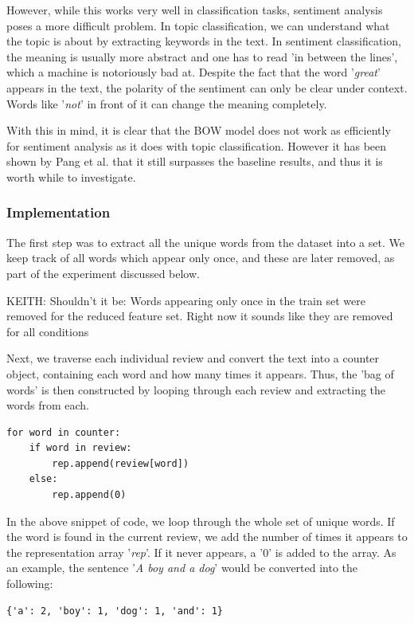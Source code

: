 \documentclass{article}
\begin{document}
However, while this works very well in classification tasks, sentiment analysis poses a more difficult problem. In topic classification, we can understand what the topic is about by extracting keywords in the text. In sentiment classification, the meaning is usually more abstract and one has to read 'in between the lines', which a machine is notoriously bad at. Despite the fact that the word '\textit{great}' appears in the text, the polarity of the sentiment can only be clear under context. Words like '\textit{not}' in front of it can change the meaning completely.

With this in mind, it is clear that the BOW model does not work as efficiently for sentiment analysis as it does with topic classification. However it has been shown by Pang et al. \cite{pangetal} that it still surpasses the baseline results, and thus it is worth while to investigate.

\subsubsection{Implementation}

The first step was to extract all the unique words from the dataset into a set. We keep track of all words which appear only once, and these are later removed, as part of the experiment discussed below. 

KEITH: Shouldn't it be: Words appearing only once in the train set were removed for the reduced feature set. Right now it sounds like they are removed for all conditions


Next, we traverse each individual review and convert the text into a counter object, containing each word and how many times it appears. Thus, the 'bag of words' is then constructed by looping through each review and extracting the words from each.

\begin{lstlisting}
for word in counter:
	if word in review:
		rep.append(review[word])
	else:
		rep.append(0)
\end{lstlisting}

In the above snippet of code, we loop through the whole set of unique words. If the word is found in the current review, we add the number of times it appears to the representation array '\textit{rep}'. If it never appears, a '0' is added to the array. As an example, the sentence '\textit{A boy and a dog}' would be converted into the following:

\begin{lstlisting}
{'a': 2, 'boy': 1, 'dog': 1, 'and': 1}
\end{lstlisting}
\end{document}
